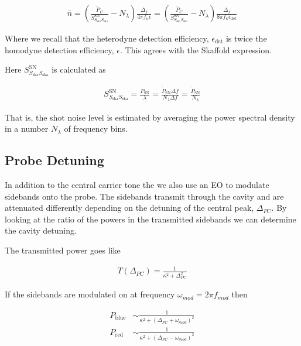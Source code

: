 \documentclass[12pt]{article}
\begin{document}
\begin{align}
\bar{n} = \left(\frac{\tilde{P}_C}{S_{S_{\text{ska}}S_{\text{ska}}}^{\text{SN}}} - N_{\lambda}\right)\frac{\Delta_f}{4\pi f_{\kappa} \epsilon} = \left(\frac{\tilde{P}_C}{S_{S_{\text{ska}}S_{\text{ska}}}^{\text{SN}}} - N_{\lambda}\right)\frac{\Delta_f}{8\pi f_{\kappa} \epsilon_{\text{det}}}
\end{align}

Where we recall that the heterodyne detection efficiency, $\epsilon_{\text{det}}$ is twice the homodyne detection efficiency, $\epsilon$. This agrees with the Skaffold expression.

Here $S_{S_{\text{ska}}S_{\text{ska}}}^{\text{SN}}$ is calculated as

\begin{align}
S_{S_{\text{ska}}S_{\text{ska}}}^{\text{SN}} = \frac{P_{\text{SN}}}{\lambda} = \frac{\tilde{P}_{\text{SN}} \Delta f}{N_{\lambda} \Delta f} = \frac{\tilde{P}_{\text{SN}}}{N_{\lambda}}
\end{align}

That is, the shot noise level is estimated by averaging the power spectral density in a number $N_{\lambda}$ of frequency bins.

\subsection{Probe Detuning}

In addition to the central carrier tone the we also use an EO to modulate sidebands onto the probe. The sidebands transmit through the cavity and are attenuated differently depending on the detuning of the central peak, $\Delta_{PC}$. By looking at the ratio of the powers in the transmitted sidebands we can determine the cavity detuning.

The transmitted power goes like

\begin{align}
T(\Delta_{PC}) = \frac{1}{\kappa^2 + \Delta_{PC}^2}
\end{align}

If the sidebands are modulated on at frequency $\omega_{mod} = 2\pi f_{mod}$ then

\begin{align}
P_{\text{blue}} &\sim \frac{1}{\kappa^2 + (\Delta_{PC}+\omega_{mod})^2}\\
P_{\text{red}} &\sim \frac{1}{\kappa^2 + (\Delta_{PC}-\omega_{mod})^2}\\
\end{align}
\end{document}
